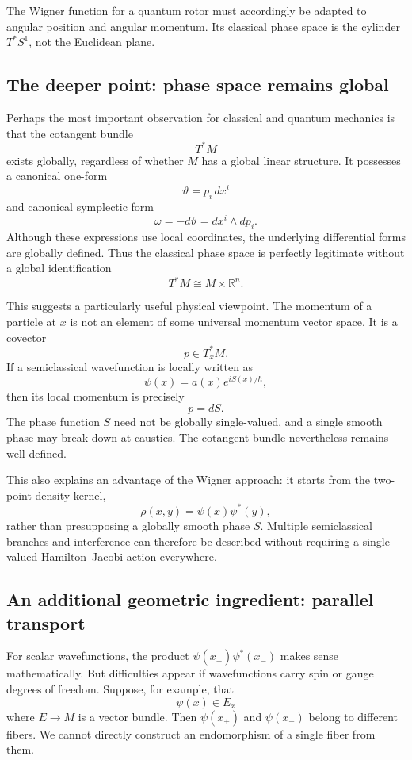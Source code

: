 The Wigner function for a quantum rotor must accordingly be adapted to angular
position and angular momentum. Its classical phase space is the cylinder
\(T^*S^1\), not the Euclidean plane. 

\subsection{The deeper point: phase space remains global}
Perhaps the most important observation for classical and quantum mechanics is
that the cotangent bundle
\[
T^*M
\]
exists globally, regardless of whether \(M\) has a global linear structure.
It possesses a canonical one-form
\[
\vartheta=p_i\,dx^i
\]
and canonical symplectic form
\[
\omega=-d\vartheta=dx^i\wedge dp_i.
\]
Although these expressions use local coordinates, the underlying differential
forms are globally defined.
Thus the classical phase space is perfectly legitimate without a global
identification
\[
T^*M\cong M\times\mathbb R^n.
\]

This suggests a particularly useful physical viewpoint.
The momentum of a particle at \(x\) is not an element of some universal
momentum vector space. It is a covector
\[
p\in T_x^*M.
\]
If a semiclassical wavefunction is locally written as
\[
\psi(x)=a(x)e^{iS(x)/\hbar},
\]
then its local momentum is precisely
\[
p=dS.
\]
The phase function \(S\) need not be globally single-valued, and a single
smooth phase may break down at caustics. The cotangent bundle nevertheless
remains well defined.

This also explains an advantage of the Wigner approach: it starts from the
two-point density kernel,
\[
\rho(x,y)=\psi(x)\psi^*(y),
\]
rather than presupposing a globally smooth phase \(S\).
Multiple semiclassical branches and interference can therefore be described
without requiring a single-valued Hamilton–Jacobi action everywhere.

\subsection{An additional geometric ingredient: parallel transport}
For scalar wavefunctions, the product \(\psi(x_+)\psi^*(x_-)\) makes sense
mathematically. But difficulties appear if wavefunctions carry spin or gauge
degrees of freedom.
Suppose, for example, that
\[
\psi(x)\in E_x
\]
where \(E\to M\) is a vector bundle.
Then \(\psi(x_+)\) and \(\psi(x_-)\) belong to different fibers. We cannot
directly construct an endomorphism of a single fiber from them.

